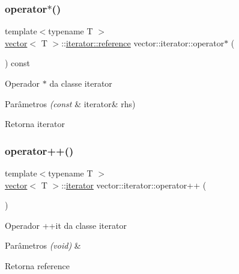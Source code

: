 \mbox{\label{classsc_1_1vector_1_1iterator_a2a4311547c42a72ef8ac29e0a6190df7}} 
\subsubsection{\texorpdfstring{operator$\ast$()}{operator*()}}
{\footnotesize\ttfamily template$<$typename T $>$ \\
\mbox{\hyperlink{classsc_1_1vector}{vector}}$<$ T $>$\+::\mbox{\hyperlink{classsc_1_1vector_1_1iterator_a266d58fdf67f2129ef3dc99efd652e15}{iterator\+::reference}} vector\+::iterator\+::operator$\ast$ (\begin{DoxyParamCaption}\item[{void}]{ }\end{DoxyParamCaption}) const}

Operador $\ast$ da classe iterator 
\begin{DoxyParams}{Parâmetros}
{\em (const} & iterator\& rhs) \\
\hline
\end{DoxyParams}
\begin{DoxyReturn}{Retorna}
iterator 
\end{DoxyReturn}
\mbox{\label{classsc_1_1vector_1_1iterator_a954d15e99dd86994ca084958c38e3596}} 
\subsubsection{\texorpdfstring{operator++()}{operator++()}\hspace{0.1cm}{\footnotesize\ttfamily [1/2]}}
{\footnotesize\ttfamily template$<$typename T $>$ \\
\mbox{\hyperlink{classsc_1_1vector}{vector}}$<$ T $>$\+::\mbox{\hyperlink{classsc_1_1vector_1_1iterator}{iterator}} vector\+::iterator\+::operator++ (\begin{DoxyParamCaption}{ }\end{DoxyParamCaption})}

Operador ++it da classe iterator 
\begin{DoxyParams}{Parâmetros}
{\em (void)} & \\
\hline
\end{DoxyParams}
\begin{DoxyReturn}{Retorna}
reference 
\end{DoxyReturn}
\mbox{\label{classsc_1_1vector_1_1iterator_a780e857e3c00f2f6dbe678260da89728}} 
